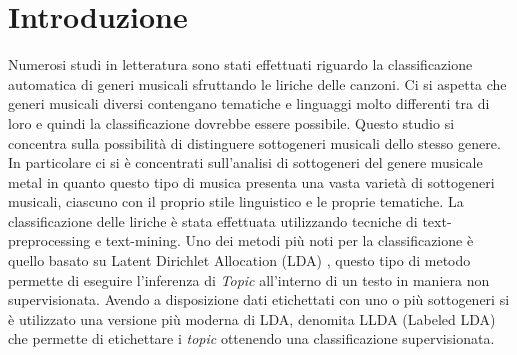 \documentclass[technote]{IEEEtran}
\begin{document}
\section{Introduzione}
Numerosi studi in letteratura sono stati effettuati riguardo la classificazione
automatica di generi musicali sfruttando le liriche delle canzoni. Ci si aspetta
che generi musicali diversi contengano tematiche e linguaggi molto differenti
tra di loro e quindi la classificazione dovrebbe essere possibile.
Questo studio si concentra sulla possibilità di distinguere sottogeneri musicali
dello stesso genere.
In particolare ci si è concentrati sull'analisi di sottogeneri del genere musicale
metal in quanto questo tipo di musica presenta una vasta varietà di sottogeneri
musicali, ciascuno con il proprio stile linguistico e le proprie tematiche.
La classificazione delle liriche è stata effettuata utilizzando tecniche di
text-preprocessing e text-mining.
Uno dei metodi più noti per la classificazione è quello basato su
Latent Dirichlet Allocation (LDA) \cite{LDA}, questo tipo di metodo permette di eseguire l'inferenza di \textit{Topic} all'interno di un testo in maniera non supervisionata.
Avendo a disposizione dati etichettati con uno o più sottogeneri si è utilizzato una versione più moderna di LDA, denomita LLDA (Labeled LDA) \cite{ramage-etal-2009-labeled} che permette di etichettare i \textit{topic} ottenendo una classificazione supervisionata.  
\end{document}

